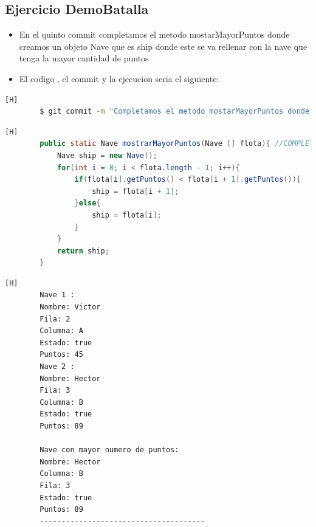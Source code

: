 \documentclass{article}
\begin{document}
	\subsection{Ejercicio DemoBatalla}
	\begin{itemize}	
		\item En el quinto commit completamos el metodo mostarMayorPuntos donde creamos un objeto Nave que es ship donde este se va rellenar con la nave que tenga la mayor cantidad de puntos 
		\item El codigo , el commit y la ejecucion seria el siguiente:
	\end{itemize}
	\begin{lstlisting}[language=bash,caption={Commit}][H]
		$ git commit -m "Completamos el metodo mostarMayorPuntos donde creamos a ship que es un objeto en el cual se llenara con el nave que tenga la mayor cantidad de puntos y despues se retornara"
	\end{lstlisting}
	\begin{lstlisting}[language=java,caption={Las lineas de codigo del metodo completado:}][H]
        public static Nave mostrarMayorPuntos(Nave [] flota){ //COMPLETAMOS ESTE METODO mostrarMayorPuntos DONDE CREAMOS UN OBJETO DE LA CLASE NAVE QUE ES SHIP EN ESTE PODREMOS GUARDAR LOS DATOS DE LA NAVE CON LA MAYOR CANTIDAD DE PUNTOS Y DESPUES RETONARNLO
            Nave ship = new Nave();
            for(int i = 0; i < flota.length - 1; i++){
                if(flota[i].getPuntos() < flota[i + 1].getPuntos()){
                    ship = flota[i + 1];
                }else{
                    ship = flota[i];
                }
            }
            return ship;
        }
	\end{lstlisting}
    \begin{lstlisting}[language=bash,caption={La ejecucion dada:}][H]
        Nave 1 : 
        Nombre: Victor
        Fila: 2
        Columna: A
        Estado: true
        Puntos: 45
        Nave 2 : 
        Nombre: Hector
        Fila: 3
        Columna: B
        Estado: true
        Puntos: 89
            
        Nave con mayor numero de puntos: 
        Nombre: Hector
        Columna: B
        Fila: 3
        Estado: true
        Puntos: 89
        --------------------------------------

    \end{lstlisting}	
\end{document}
